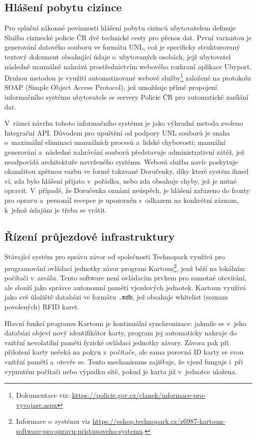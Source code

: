 \subsection{Hlášení pobytu cizince}
Pro splnění zákonné povinnosti hlášení pobytu cizinců ubytovatelem definuje Služba cizinecké policie ČR dvě technické cesty pro přenos dat.
První variantou je generování datového souboru ve formátu UNL, což je specificky strukturovaný textový dokument obsahující údaje o~ubytovaných osobách, jejž ubytovatel následně manuálně nahrává prostřednictvím webového rozhraní aplikace Ubyport.
Druhou metodou je využití automatizované webové služby\footnote{Dokumentace viz: \url{https://policie.gov.cz/clanek/informace-pro-vyvojare.aspx}} založené na protokolu SOAP (Simple Object Access Protocol), jež umožňuje přímé propojení informačního systému ubytovatele se servery Policie ČR pro automatické zasílání dat.

V~rámci návrhu tohoto informačního systému je jako výhradní metoda zvoleno Integrační API.
Důvodem pro upuštění od podpory UNL souborů je snaha o~maximální eliminaci manuálních procesů a~lidské chybovosti; manuální generování a~následné nahrávání souborů představuje administrativní zátěž, jež neodpovídá architektuře navrženého systému.
Webová služba navíc poskytuje okamžitou zpětnou vazbu ve formě takzvané Doručenky, díky které systém ihned ví, zda bylo hlášení přijato v~pořádku, nebo zda obsahuje chyby, jež je nutné opravit.
V~případě, že Doručenka oznámí neúspěch, je hlášení zařazeno do fronty pro opravu a~personál recepce je upozorněn s~odkazem na konkrétní záznam, k~jehož údajům je třeba se vrátit.

\subsection{Řízení průjezdové infrastruktury}
\label{sec:zavory}
Stávající systém pro správu závor od společnosti Technopark využívá pro programování ovládací jednotky závor program Kartoun\footnote{Informace o~systému viz \url{https://eshop.technopark.cz/z6987-kartoun-software-pro-spravu-pristupoveho-systemu}.}, jenž běží na lokálním počítači v~areálu.
Tento software není ovládacím prvkem pro samotné otevírání, ale slouží jako správce autonomní paměti vjezdových jednotek.
Kartoun využívá jako své úložiště databázi ve formátu \texttt{.mdb}, jež obsahuje whitelist (seznam povolených) RFID karet.

Hlavní funkcí programu Kartoun je kontinuální synchronizace: jakmile se v~jeho databázi objeví nový identifikátor karty, program jej automaticky nahraje do vnitřní nevolatilní paměti fyzické ovládací jednotky závory.
Závora pak při přiložení karty nečeká na pokyn z~počítače, ale sama porovná ID karty se svou vnitřní pamětí a~otevře se.
Tento mechanismus zajišťuje, že vjezd funguje i~při vypnutém počítači nebo výpadku sítě, pokud je karta již v~jednotce uložena.

